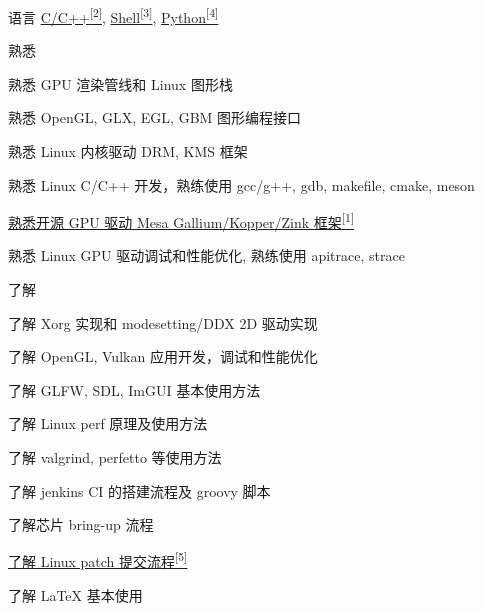 
\begin{cvskills}
  \cvskill
    {语言} %
    {\hyperlink{cpp-proj}{C/C++\textsuperscript{[2]}}, \hyperlink{shell-proj}{Shell\textsuperscript{[3]}}, \hyperlink{python-proj}{Python\textsuperscript{[4]}}} %
\end{cvskills}

\begin{cventries}
  \cventry
    {} %
    {熟悉} %
    {} %
    {} %
    {
      \begin{cvitems} %
        \item {熟悉 GPU 渲染管线和 Linux 图形栈}
        \item {熟悉 OpenGL, GLX, EGL, GBM 图形编程接口}
        \item {熟悉 Linux 内核驱动 DRM, KMS 框架}
        \item {熟悉 Linux C/C++ 开发，熟练使用 gcc/g++, gdb, makefile, cmake, meson}
        \item {\hyperlink{mesa-mr}{熟悉开源 GPU 驱动 Mesa Gallium/Kopper/Zink 框架\textsuperscript{[1]}}}
        \item {熟悉 Linux GPU 驱动调试和性能优化, 熟练使用 apitrace, strace}
      \end{cvitems}
    }
  \cventry
    {} %
    {了解} %
    {} %
    {} %
    {
      \begin{cvitems} %
        \item {了解 Xorg 实现和 modesetting/DDX 2D 驱动实现}
        \item {了解 OpenGL, Vulkan 应用开发，调试和性能优化}
        \item {了解 GLFW, SDL, ImGUI 基本使用方法}
        \item {了解 Linux perf 原理及使用方法}
        \item {了解 valgrind, perfetto 等使用方法}
        \item {了解 jenkins CI 的搭建流程及 groovy 脚本}
        \item {了解芯片 bring-up 流程}
        \item {\hyperlink{linux-patches}{了解 Linux patch 提交流程\textsuperscript{[5]}}}
        \item {了解 LaTeX 基本使用}
      \end{cvitems}
    }
\end{cventries}

